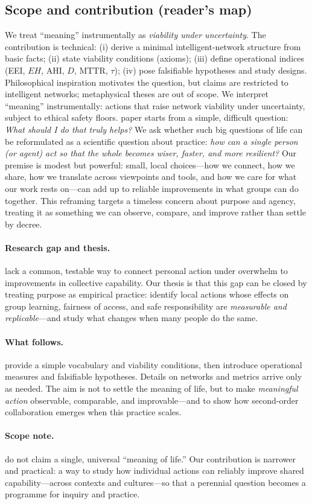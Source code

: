 \documentclass[12pt]{article}
\begin{document}
\subsection*{Scope and contribution (reader's map)}
We treat ``meaning'' instrumentally as \emph{viability under uncertainty}. The contribution is technical: (i) derive a minimal intelligent-network structure from basic facts; (ii) state viability conditions (axioms); (iii) define operational indices (EEI, $EH$, AHI, $D$, MTTR, $\tau$); (iv) pose falsifiable hypotheses and study designs. Philosophical inspiration motivates the question, but claims are restricted to intelligent networks; metaphysical theses are out of scope.
We interpret ``meaning'' instrumentally: actions that raise network viability under uncertainty, subject to ethical safety floors.
\nThis paper starts from a simple, difficult question: \emph{What should I do that truly helps?} We ask whether such big questions of life can be reformulated as a scientific question about practice: \emph{how can a single person (or agent) act so that the whole becomes wiser, faster, and more resilient?} Our premise is modest but powerful: small, local choices—how we connect, how we share, how we translate across viewpoints and tools, and how we care for what our work rests on—can add up to reliable improvements in what groups can do together. This reframing targets a timeless concern about purpose and agency, treating it as something we can observe, compare, and improve rather than settle by decree.\n\n\paragraph{Research gap and thesis.}\nWe lack a common, testable way to connect personal action under overwhelm to improvements in collective capability. Our thesis is that this gap can be closed by treating purpose as empirical practice: identify local actions whose effects on group learning, fairness of access, and safe responsibility are \emph{measurable and replicable}—and study what changes when many people do the same.\n\n\paragraph{What follows.}\nWe provide a simple vocabulary and viability conditions, then introduce operational measures and falsifiable hypotheses. Details on networks and metrics arrive only as needed. The aim is not to settle the meaning of life, but to make \emph{meaningful action} observable, comparable, and improvable—and to show how second-order collaboration emerges when this practice scales.\n\n\paragraph{Scope note.}\nWe do not claim a single, universal ``meaning of life.'' Our contribution is narrower and practical: a way to study how individual actions can reliably improve shared capability—across contexts and cultures—so that a perennial question becomes a programme for inquiry and practice.\n
\end{document}
